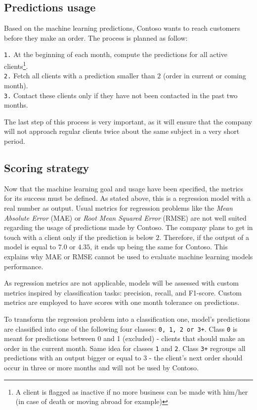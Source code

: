 \subsection{Predictions usage}
Based on the machine learning predictions, Contoso wants to reach customers before they make an order. The process is planned as follow:

\noindent\hspace*{0.8cm}  \texttt{1.} At the beginning of each month, compute the predictions for all active clients\footnote{A client is flagged as inactive if no more business can be made with him/her (in case of death or moving abroad for example)}. \\
\hspace*{0.8cm}           \texttt{2.} Fetch all clients with a prediction smaller than $2$ (order in current or coming month). \\
\hspace*{0.8cm}           \texttt{3.} Contact these clients only if they have not been contacted in the past two months.

The last step of this process is very important, as it will ensure that the company will not approach regular clients twice about the same subject in a very short period.


\subsection{Scoring strategy}
Now that the machine learning goal and usage have been specified, the metrics for its success must be defined. As stated above, this is a regression model with a real number as output. Usual metrics for regression problems like the \textit{Mean Absolute Error} (MAE) or \textit{Root Mean Squared Error} (RMSE) are not well suited regarding the usage of predictions made by Contoso. The company plans to get in touch with a client only if the prediction is below $2$. Therefore, if the output of a model is equal to $7.0$ or $4.35$, it ends up being the same for Contoso. This explains why MAE or RMSE cannot be used to evaluate machine learning models performance. 

As regression metrics are not applicable, models will be assessed with custom metrics inspired by classification tasks: precision, recall, and F1-score. Custom metrics are employed to have scores with one month tolerance on predictions.

To transform the regression problem into a classification one, model's predictions are classified into one of the following four classes: \texttt{0, 1, 2 or 3+}. Class \texttt{0} is meant for predictions between 0 and 1 (excluded) - clients that should make an order in the current month. Same idea for classes \texttt{1} and \texttt{2}. Class \texttt{3+} regroups all predictions with an output bigger or equal to 3 - the client's next order should occur in three or more months and will not be used by Contoso.


